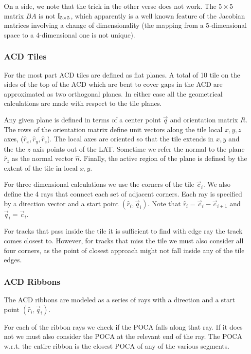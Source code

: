\documentclass[fleqn,twoside,draft]{article}
\begin{document}
On a side, we note that the trick in the other verse does not work. The $5\times5$ matrix $BA$ is not ${\rm I_{5\times5}}$, which apparently is a well known feature of the Jacobian matrices involving a change of dimensionality (the mapping from a 5-dimensional space to a 4-dimensional one is not unique).


\subsubsection{ACD Tiles}

For the most part ACD tiles are defined as flat planes.  A total of 10 tile on the sides of the top of the ACD which are bent to cover gaps in the ACD are approximated as two orthogonal planes.  In either case all the geometrical calculations are made with respect to the tile planes. 

Any given plane is defined in terms of a center point $\vec{q}$ and orientation matrix $R$.  The rows of the orientation matrix define unit vectors along the tile local $x,y,z$ axes, ($\hat{r}_{x},\hat{r}_{y},\hat{r}_{z}$).  The local axes are oriented so that the tile extends in $x,y$ and the the $z$ axis points out of the LAT.  Sometime we refer the normal to the plane $\hat{r}_{z}$ as the normal vector $\hat{n}$.  Finally, the active region of the plane is defined by the extent of the tile in local $x,y$.  

For three dimensional calculations we use the corners of the tile $\vec{c}_i$.  We also define the 4 rays that connect each set of adjacent corners.  Each ray is specified by a direction vector and a start point $(\hat{r}_i,\vec{q}_i)$.  Note that $\hat{r}_i = \vec{c}_i - \vec{c}_{i+1}$ and $\vec{q}_i = \vec{c}_i$.

For tracks that pass inside the tile it is sufficient to find with edge ray the track comes closest to.  However, for tracks that miss the tile we must also consider all four corners, as the point of closest approach might not fall inside any of the tile edges.

\subsubsection{ACD Ribbons}

The ACD ribbons are modeled as a series of rays with a direction and a start point $(\hat{r}_i,\vec{q}_i)$.  

For each of the ribbon rays we check if the POCA falls along that ray.  If it does not we must also consider the POCA at the relevant end of the ray.  The POCA w.r.t. the entire ribbon is the closest POCA of any of the various segments.
\end{document}
